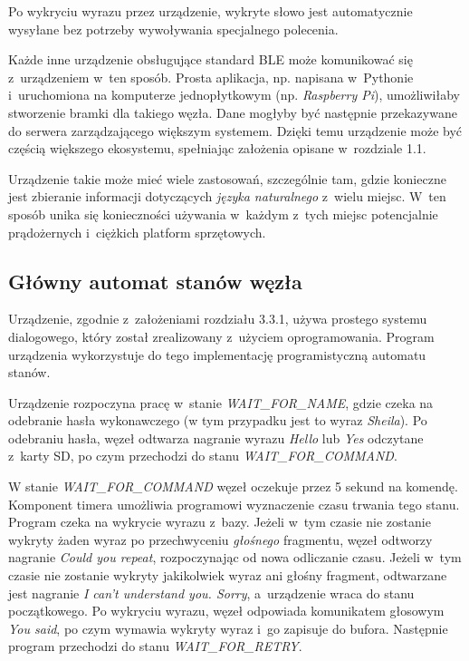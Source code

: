 Po wykryciu wyrazu przez urządzenie, wykryte słowo jest automatycznie wysyłane bez potrzeby wywoływania specjalnego polecenia.

Każde inne urządzenie obsługujące standard BLE może komunikować się z~urządzeniem w~ten sposób. Prosta aplikacja, np. napisana w~Pythonie i~uruchomiona na komputerze jednopłytkowym (np. \textit{Raspberry Pi}), umożliwiłaby stworzenie bramki dla takiego węzła. Dane mogłyby być następnie przekazywane do serwera zarządzającego większym systemem. Dzięki temu urządzenie może być częścią większego ekosystemu, spełniając założenia opisane w~rozdziale 1.1.

Urządzenie takie może mieć wiele zastosowań, szczególnie tam, gdzie konieczne jest zbieranie informacji dotyczących \textit{języka naturalnego} z~wielu miejsc. W~ten sposób unika się konieczności używania w~każdym z~tych miejsc potencjalnie prądożernych i~ciężkich platform sprzętowych.

\subsection{Główny automat stanów węzła}
Urządzenie, zgodnie z~założeniami rozdziału 3.3.1, używa prostego systemu dialogowego, który został zrealizowany z~użyciem oprogramowania. Program urządzenia wykorzystuje do tego implementację programistyczną automatu stanów.

Urządzenie rozpoczyna pracę w~stanie \textit{WAIT\_FOR\_NAME}, gdzie czeka na odebranie hasła wykonawczego (w tym przypadku jest to wyraz \textit{Sheila}). Po odebraniu hasła, węzeł odtwarza nagranie wyrazu \textit{Hello} lub \textit{Yes} odczytane z~karty SD, po czym przechodzi do stanu \textit{WAIT\_FOR\_COMMAND}.

W stanie \textit{WAIT\_FOR\_COMMAND} węzeł oczekuje przez 5 sekund na komendę. Komponent timera umożliwia programowi wyznaczenie czasu trwania tego stanu. Program czeka na wykrycie wyrazu z~bazy. Jeżeli w~tym czasie nie zostanie wykryty żaden wyraz po przechwyceniu \textit{głośnego} fragmentu, węzeł odtworzy nagranie \textit{Could you repeat}, rozpoczynając od nowa odliczanie czasu. Jeżeli w~tym czasie nie zostanie wykryty jakikolwiek wyraz ani głośny fragment, odtwarzane jest nagranie \textit{I can't understand you. Sorry}, a~urządzenie wraca do stanu początkowego. Po wykryciu wyrazu, węzeł odpowiada komunikatem głosowym \textit{You said}, po czym wymawia wykryty wyraz i~go zapisuje do bufora. Następnie program przechodzi do stanu \textit{WAIT\_FOR\_RETRY}.

